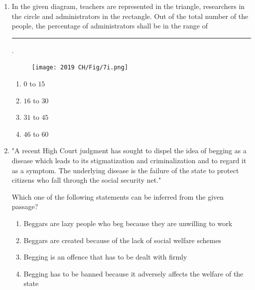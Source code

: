 \documentclass[journal,12pt,onecolumn]{IEEEtran}
\theoremstyle{remark}
\begin{document}
\begin{enumerate}
\hfill{}
\begin{multicols}{4}
    \begin{enumerate}
        \item P
        \item R
        \item S
        \item Q
    \end{enumerate}
\end{multicols}

    \item In the given diagram, teachers are represented in the triangle, researchers in the circle and administrators in the rectangle. Out of the total number of the people, the percentage of administrators shall be in the range of \rule{1cm}{0.1mm} .
    
\hfill{}
\begin{figure}[H]
    \centering
    \texttt{[image: 2019 CH/Fig/7i.png]}
    \caption{}
    \label{fig:7i}
\end{figure}

\begin{multicols}{4}
    \begin{enumerate}
        \item $0$ to $15$
        \item $16$ to $30$
        \item $31$ to $45$
        \item $46$ to $60$
    \end{enumerate}
\end{multicols}

    \item "A recent High Court judgment has sought to dispel the idea of begging as a disease which leads to its stigmatization and criminalization and to regard it as a symptom. The underlying disease is the failure of the state to protect citizens who fall through the social security net."

Which one of the following statements can be inferred from the given passage?

\hfill{}
    \begin{enumerate}
        \item Beggars are lazy people who beg because they are unwilling to work
        \item Beggars are created because of the lack of social welfare schemes
        \item Begging is an offence that has to be dealt with firmly
        \item Begging has to be banned because it adversely affects the welfare of the state
    \end{enumerate}
    

\end{enumerate}
\end{document}
